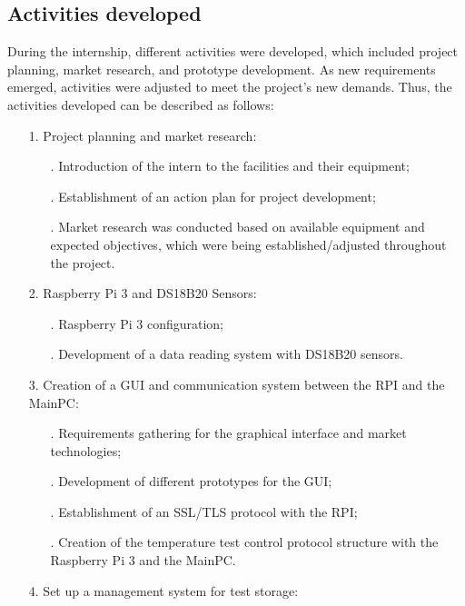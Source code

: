 \subsection{Activities developed}

During the internship, different activities were developed, which included project planning, market research, and prototype development. As new requirements emerged, activities were adjusted to meet the project's new demands. Thus, the activities developed can be described as follows:

\begin{itemize}
    \item[] 1. Project planning and market research:
        \begin{itemize}
            \item[.] Introduction of the intern to the facilities and their equipment;
            \item[.] Establishment of an action plan for project development;
            \item[.] Market research was conducted based on available equipment and expected objectives, which were being established/adjusted throughout the project.
        \end{itemize}
    \item[] 2. Raspberry Pi 3 and DS18B20 Sensors:
        \begin{itemize}
            \item[.] Raspberry Pi 3 configuration;
            \item[.] Development of a data reading system with DS18B20 sensors.
        \end{itemize}
    \item[] 3. Creation of a GUI and communication system between the RPI and the MainPC: 
        \begin{itemize}
            \item[.] Requirements gathering for the graphical interface and market technologies;
            \item[.] Development of different prototypes for the GUI;
            \item[.] Establishment of an SSL/TLS protocol with the RPI;
            \item[.] Creation of the temperature test control protocol structure with the Raspberry Pi 3 and the MainPC.
        \end{itemize}
    \item[] 4. Set up a management system for test storage:
        \begin{itemize}

\end{itemize}
\end{itemize}
